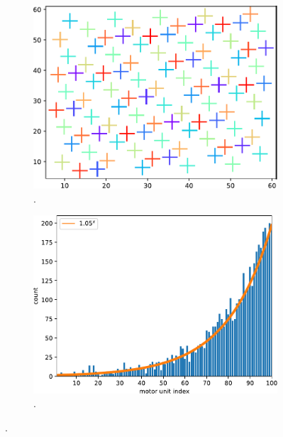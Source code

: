 \begin{figure}%
  \centering%
  \begin{subfigure}[t]{0.48\textwidth}%
    \centering%
    \includegraphics[width=\textwidth]{images/motor_unit_assignment/MU_fibre_distribution_67x67_100_mu_positions.pdf}%
    \caption{.}%
    \label{fig:MU_fibre_distribution_67x67_100_mu_positions}%
  \end{subfigure}
  \quad
  \begin{subfigure}[t]{0.48\textwidth}%
    \centering%
    \includegraphics[width=\textwidth]{images/motor_unit_assignment/MU_fibre_distribution_67x67_100_fiber_distribution.pdf}%
    \caption{.}%
    \label{fig:MU_fibre_distribution_67x67_100_fiber_distribution}%
  \end{subfigure}

\end{figure}
